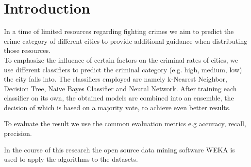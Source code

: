 \section{Introduction}

In a time of limited resources regarding fighting crimes we aim to predict the crime category of different cities to provide additional guidance when distributing those resources. \\

\noindent To emphasize the influence of certain factors on the criminal rates of cities, we use different classifiers to predict the criminal category (e.g. high, medium, low) the city falls into. The classifiers employed are namely k-Nearest Neighbor, Decision Tree, Naive Bayes Classifier and Neural Network. After training each classifier on its own, the obtained models are combined into an ensemble, the decision of which is based on a majority vote, to achieve even better results. 

To evaluate the result we use the common evaluation metrics  e.g accuracy, recall, precision.

In the course of this research the open source data mining software WEKA is used to apply the algorithms to the datasets.

\vspace*{\fill}